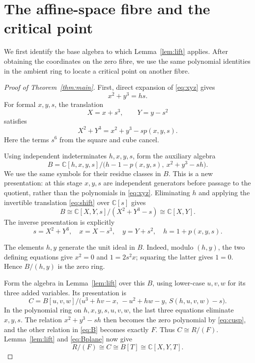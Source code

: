 \documentclass[11pt]{article}
\numberwithin{equation}{section}
\newcommand{\CC}{\mathbb C}
\begin{document}
\section{The affine-space fibre and the critical point}\label{sec:mainproof}

We first identify the base algebra to which Lemma~\ref{lem:lift} applies.
After obtaining the coordinates on the zero fibre, we use the same polynomial
identities in the ambient ring to locate a critical point on another fibre.

\begin{proof}[Proof of Theorem~\ref{thm:main}]
First, direct expansion of \eqref{eq:xyz} gives
\begin{equation}
  x^2+y^3=hs. \label{eq:cusp}
\end{equation}
For formal $x,y,s$, the translation
\begin{equation}
  X=x+s^3,\qquad Y=y-s^2 \label{eq:shift}
\end{equation}
satisfies
\begin{equation}
  X^2+Y^3=x^2+y^3-sp(x,y,s). \label{eq:shiftidentity}
\end{equation}
Here the terms $s^6$ from the square and cube cancel.

Using independent indeterminates $h,x,y,s$, form the auxiliary algebra
\begin{equation}
  B=\CC[h,x,y,s]/\bigl(h-1-p(x,y,s),\ x^2+y^3-sh\bigr).
  \label{eq:B}
\end{equation}
We use the same symbols for their residue classes in $B$.
This is a new presentation: at this stage $x,y,s$ are independent generators
before passage to the quotient, rather than the polynomials in \eqref{eq:xyz}.
Eliminating $h$ and applying the invertible translation
\eqref{eq:shift} over $\CC[s]$ gives
\begin{equation}
  B\cong\CC[X,Y,s]/(X^2+Y^3-s)\cong\CC[X,Y]. \label{eq:Bplane}
\end{equation}
The inverse presentation is explicitly
\begin{equation}
  s=X^2+Y^3,\quad x=X-s^3,\quad y=Y+s^2,
  \quad h=1+p(x,y,s). \label{eq:Bparam}
\end{equation}

The elements $h,y$ generate the unit ideal in $B$. Indeed, modulo $(h,y)$,
the two defining equations give $x^2=0$ and $1=2s^2x$; squaring the latter
gives $1=0$. Hence $B/(h,y)$ is the zero ring.

Form the algebra in Lemma~\ref{lem:lift} over this $B$, using lower-case
$u,v,w$ for its three added variables. Its presentation is
\[
  C=B[u,v,w]/\bigl(u^3+hv-x,\,-u^2+hw-y,\,
                      S(h,u,v,w)-s\bigr).
\]
In the polynomial ring on $h,x,y,s,u,v,w$, the last three equations eliminate
$x,y,s$. The relation $x^2+y^3-sh$ then becomes the zero polynomial by
\eqref{eq:cusp}, and the other relation in \eqref{eq:B} becomes exactly $F$.
Thus $C\cong R/(F)$. Lemma~\ref{lem:lift} and \eqref{eq:Bplane} now give
\begin{equation}
  R/(F)\cong C\cong B[T]\cong\CC[X,Y,T]. \label{eq:fiber}
\end{equation}


\end{proof}
\end{document}
